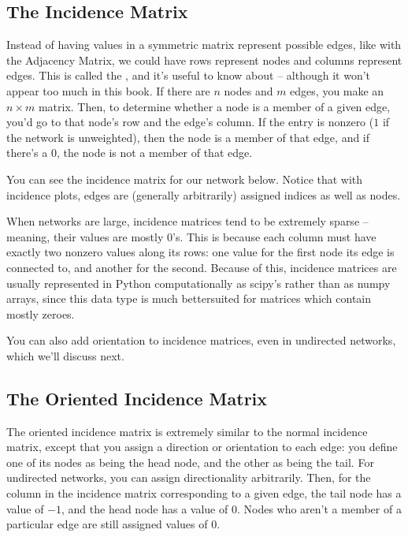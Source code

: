 \documentclass[letterpaper,10pt,english]{jupyterBook}
\begin{document}
\subsection{The Incidence Matrix}
\label{\detokenize{representations/ch4/matrix-representations:the-incidence-matrix}}
\sphinxAtStartPar
Instead of having values in a symmetric matrix represent possible edges, like with the Adjacency Matrix, we could have rows represent nodes and columns represent edges. This is called the , and it’s useful to know about – although it won’t appear too much in this book. If there are \(n\) nodes and \(m\) edges, you make an \(n \times m\) matrix. Then, to determine whether a node is a member of a given edge, you’d go to that node’s row and the edge’s column. If the entry is nonzero (\(1\) if the network is unweighted), then the node is a member of that edge, and if there’s a \(0\), the node is not a member of that edge.

\sphinxAtStartPar
You can see the incidence matrix for our network below. Notice that with incidence plots, edges are (generally arbitrarily) assigned indices as well as nodes.

\noindent{}

\sphinxAtStartPar
When networks are large, incidence matrices tend to be extremely sparse – meaning, their values are mostly 0’s. This is because each column must have exactly two nonzero values along its rows: one value for the first node its edge is connected to, and another for the second. Because of this, incidence matrices are usually represented in Python computationally as scipy’s  rather than as numpy arrays, since this data type is much better\sphinxhyphen{}suited for matrices which contain mostly zeroes.

\sphinxAtStartPar
You can also add orientation to incidence matrices, even in undirected networks, which we’ll discuss next.


\subsection{The Oriented Incidence Matrix}
\label{\detokenize{representations/ch4/matrix-representations:the-oriented-incidence-matrix}}
\sphinxAtStartPar
The oriented incidence matrix is extremely similar to the normal incidence matrix, except that you assign a direction or orientation to each edge: you define one of its nodes as being the head node, and the other as being the tail. For undirected networks, you can assign directionality arbitrarily. Then, for the column in the incidence matrix corresponding to a given edge, the tail node has a value of \(-1\), and the head node has a value of \(0\). Nodes who aren’t a member of a particular edge are still assigned values of \(0\).
\end{document}
